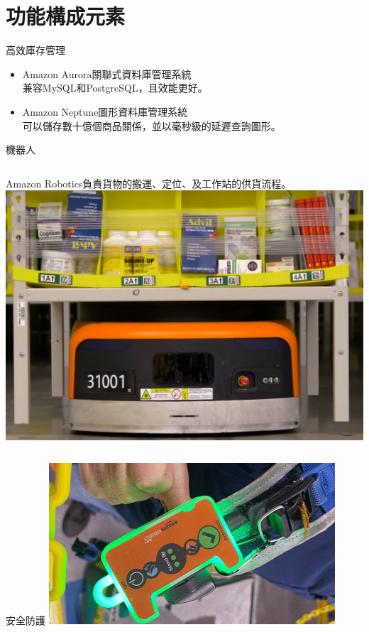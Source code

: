 \documentclass[10pt, aspectratio=169]{beamer}
\begin{document}
\section{功能構成元素}

\begin{frame}{高效庫存管理}
  \begin{itemize}
    \item Amazon Aurora關聯式資料庫管理系統\\
      兼容MySQL和PostgreSQL，且效能更好。
    \item Amazon Neptune圖形資料庫管理系統\\
      可以儲存數十億個商品關係，並以毫秒級的延遲查詢圖形。
  \end{itemize}
\end{frame}

{
\begin{frame}{機器人}
  \begin{columns}
      Amazon Robotics負責貨物的搬運、定位、及工作站的供貨流程。
      \includegraphics[width=\textwidth]{images/amazon-robotics.png}
  \end{columns}
	
\end{frame}
}
\begin{frame}{安全防護}
  \centering
  \includegraphics[width=0.8\textwidth]{images/amazon-vest.png}
\end{frame}
\end{document}
